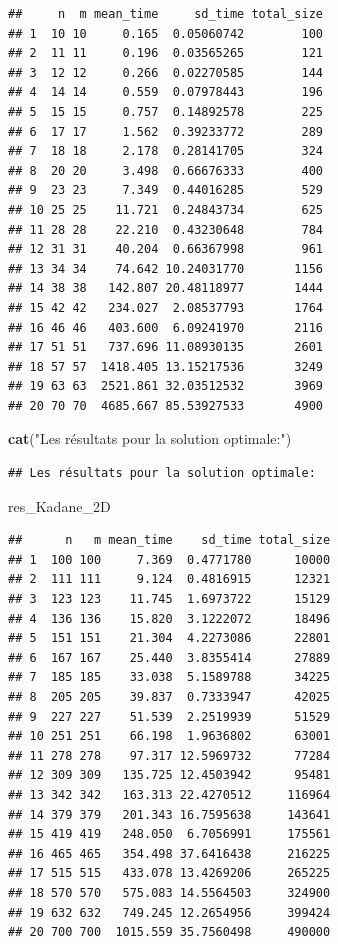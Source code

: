 \documentclass[
]{article}
\newenvironment{Shaded}{\begin{snugshade}}{\end{snugshade}}
\newcommand{\FunctionTok}[1]{\textcolor[rgb]{0.13,0.29,0.53}{\textbf{#1}}}
\newcommand{\NormalTok}[1]{#1}
\newcommand{\StringTok}[1]{\textcolor[rgb]{0.31,0.60,0.02}{#1}}
\begin{document}
\begin{verbatim}
##     n  m mean_time     sd_time total_size
## 1  10 10     0.165  0.05060742        100
## 2  11 11     0.196  0.03565265        121
## 3  12 12     0.266  0.02270585        144
## 4  14 14     0.559  0.07978443        196
## 5  15 15     0.757  0.14892578        225
## 6  17 17     1.562  0.39233772        289
## 7  18 18     2.178  0.28141705        324
## 8  20 20     3.498  0.66676333        400
## 9  23 23     7.349  0.44016285        529
## 10 25 25    11.721  0.24843734        625
## 11 28 28    22.210  0.43230648        784
## 12 31 31    40.204  0.66367998        961
## 13 34 34    74.642 10.24031770       1156
## 14 38 38   142.807 20.48118977       1444
## 15 42 42   234.027  2.08537793       1764
## 16 46 46   403.600  6.09241970       2116
## 17 51 51   737.696 11.08930135       2601
## 18 57 57  1418.405 13.15217536       3249
## 19 63 63  2521.861 32.03512532       3969
## 20 70 70  4685.667 85.53927533       4900
\end{verbatim}

\begin{Shaded}
\begin{Highlighting}[]
\FunctionTok{cat}\NormalTok{(}\StringTok{"Les résultats pour la solution optimale:"}\NormalTok{)}
\end{Highlighting}
\end{Shaded}

\begin{verbatim}
## Les résultats pour la solution optimale:
\end{verbatim}

\begin{Shaded}
\begin{Highlighting}[]
\NormalTok{res\_Kadane\_2D}
\end{Highlighting}
\end{Shaded}

\begin{verbatim}
##      n   m mean_time    sd_time total_size
## 1  100 100     7.369  0.4771780      10000
## 2  111 111     9.124  0.4816915      12321
## 3  123 123    11.745  1.6973722      15129
## 4  136 136    15.820  3.1222072      18496
## 5  151 151    21.304  4.2273086      22801
## 6  167 167    25.440  3.8355414      27889
## 7  185 185    33.038  5.1589788      34225
## 8  205 205    39.837  0.7333947      42025
## 9  227 227    51.539  2.2519939      51529
## 10 251 251    66.198  1.9636802      63001
## 11 278 278    97.317 12.5969732      77284
## 12 309 309   135.725 12.4503942      95481
## 13 342 342   163.313 22.4270512     116964
## 14 379 379   201.343 16.7595638     143641
## 15 419 419   248.050  6.7056991     175561
## 16 465 465   354.498 37.6416438     216225
## 17 515 515   433.078 13.4269206     265225
## 18 570 570   575.083 14.5564503     324900
## 19 632 632   749.245 12.2654956     399424
## 20 700 700  1015.559 35.7560498     490000
\end{verbatim}
\end{document}
